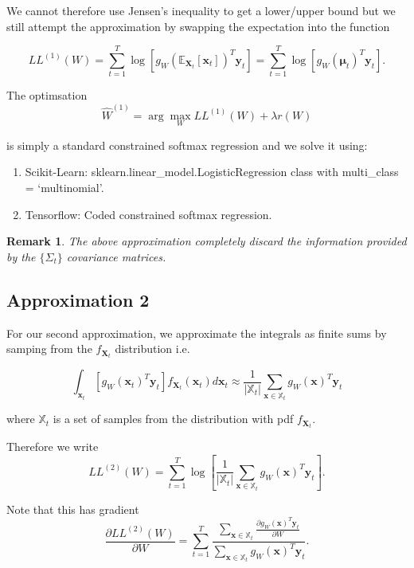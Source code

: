 \documentclass[
10pt, %
a4paper, %
oneside, %
headinclude,footinclude, %
BCOR5mm, %
]{scrartcl}
\newcommand{\bfmu}{\boldsymbol{\mu}}
\newcommand{\bfX}{\boldsymbol{X}}
\newcommand{\bfx}{\boldsymbol{x}}
\newcommand{\bfy}{\boldsymbol{y}}
\newtheorem{remark}{Remark}
\begin{document}
We cannot therefore use Jensen's inequality to get a lower/upper bound but we still attempt the approximation by swapping the expectation into the function

$$ LL^{(1)}(W) = \sum_{t=1}^T \log \left [g_W(\mathbb{E}_{\bfX_t}[\bfx_t])^T \bfy_t \right ] = \sum_{t=1}^T \log \left [g_W(\bfmu_t)^T \bfy_t \right ].$$

The optimsation
$$ \hat{W}^{(1)} = \arg \max_W LL^{(1)}(W) + \lambda r(W) $$

is simply a standard constrained softmax regression and we solve it using:
\begin{enumerate}
  \item Scikit-Learn: sklearn.linear\_model.LogisticRegression class with multi\_class = `multinomial'.
  \item Tensorflow: Coded constrained softmax regression.
\end{enumerate}

\begin{remark}
The above approximation completely discard the information provided by the $\{\Sigma_t\}$ covariance matrices.
\end{remark}

\subsection{Approximation 2}
For our second approximation, we approximate the integrals as finite sums by samping from the $f_{\bfX_t}$ distribution i.e.

$$ \int_{\bfx_t} \left [g_W(\bfx_t)^T \bfy_t \right ] f_{\bfX_t}(\bfx_t) d\bfx_t \approx \frac{1}{| \mathbb{X}_t |}\sum_{\bfx \in \mathbb{X}_t} g_W(\bfx)^T \bfy_t $$

where $\mathbb{X}_t$ is a set of samples from the distribution with pdf $f_{\bfX_t}$.

Therefore we write
$$ LL^{(2)}(W) = \sum_{t=1}^T \log \left [ \frac{1}{| \mathbb{X}_t |}\sum_{\bfx \in \mathbb{X}_t} g_W(\bfx)^T \bfy_t \right ].$$

Note that this has gradient
$$ \frac{\partial LL^{(2)}(W)}{\partial W} = \sum_{t=1}^T  \frac{\sum_{\bfx \in \mathbb{X}_t} \frac{\partial g_W(\bfx)^T \bfy_t}{\partial W}} {\sum_{\bfx \in \mathbb{X}_t} g_W(\bfx)^T \bfy_t} .$$
\end{document}
